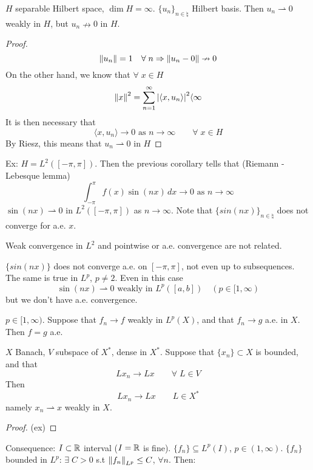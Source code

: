 \begin{corollary}
    \(H\) separable Hilbert space, \(\dim H = \infty\). \(\{u_n\}_{n \in \natural}\) Hilbert basis. Then \(u_n \rightharpoonup 0\) weakly in \(H\), but \(u_n \nrightarrow 0\) in \(H\).
\end{corollary}
\begin{proof}
    \[
        \norm{u_n}=1 \quad \forall\; n \Rightarrow \norm{u_n -0} \nrightarrow 0 
    \]
    On the other hand, we know that \(\forall \; x \in H\)
    \[
        \norm{x}^2 = \sum_{n=1}^\infty \abs{\langle x, u_n\rangle  }^2 \langle  \infty
    \]
    It is then necessary that
    \[
        \langle x, u_n\rangle   \to 0 \text{ as } n \to \infty \qquad \forall\; x \in H
    \]
    By Riesz, this means that \(u_n \rightharpoonup 0\) in \(H\)
\end{proof}

Ex: \(H = L^2([-\pi, \pi])\). Then the previous corollary tells that (Riemann - Lebesque lemma)
\[
    \int_{-\pi}^\pi f(x) \sin (nx) \, dx \to 0 \text{ as } n \to \infty
\]                
\(\sin(nx) \rightharpoonup 0\) in \(L^2([-\pi, \pi])\) as \(n \to \infty\). Note that \(\{sin(nx)\}_{n \in \natural}\) does not converge for a.e. \(x\).

Weak convergence in \(L^2\) and pointwise or a.e. convergence are not related.

\(\{sin(nx)\}\) does not converge a.e. on \([-\pi, \pi]\), not even up to subsequences. 
The same is true in \(L^p\), \(p \neq 2\). Even in this case
\[
    \sin(nx) \rightharpoonup 0 \text{ weakly in } L^p([a,b]) \quad (p \in [1, \infty)
\] 
but we don't have a.e. convergence.

\begin{proposition}
    \(p \in [1, \infty)\). Suppose that \(f_n \to f\) weakly in \(L^p(X)\), and that \(f_n \to g\) a.e. in \(X\). Then \(f=g\) a.e.
\end{proposition}

\begin{proposition}
    \(X\) Banach, \(V\) subspace of \(X^*\), dense in \(X^*\). Suppose that \(\{x_n\} \subset X\) is bounded, and that 
    \[
        L x_n \to Lx \qquad \forall\; L \in V
    \]
    Then
    \[
        L x_n \to Lx \qquad L \in X^*
    \]
    namely \(x_n \rightharpoonup x\) weakly in \(X\).
\end{proposition}
\begin{proof}
    (ex)
\end{proof}

Consequence: \(I \subset \mathbb{R}\) interval (\(I= \mathbb{R}\) is fine). \(\{f_n\} \subseteq L^p(I)\), \(p \in (1, \infty)\). 
\(\{f_n\}\) bounded in \(L^p\): \(\exists \; C>  0\) s.t \(\norm{f_n}_{L^p} \leq C\), \(\forall n\). Then:

